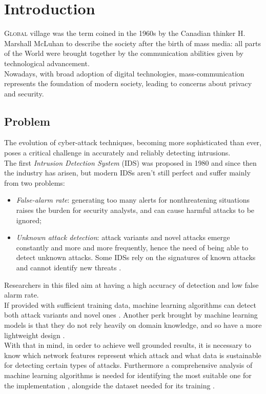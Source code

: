 \chapter{Introduction}
\label{chap:intro}

\lettrine[lines=3, findent=3pt, nindent=0pt]{G}{lobal} village was the term coined in the 1960s by the Canadian thinker H. Marshall McLuhan \cite{mcluhan1962} to describe the society after the birth of mass media: all parts of the World were brought together by the communication abilities given by technological advancement. \\
Nowadays, with broad adoption of digital technologies, mass-communication represents the foundation of modern society, leading to concerns about privacy and security.




\section{Problem}
\label{sec:problem}

The evolution of cyber-attack techniques, becoming more sophisticated than ever, poses a critical challenge in accurately and reliably detecting intrusions.\\ The first \textit{Intrusion Detection System} (IDS) was proposed in 1980 \cite{Andreson1980} and since then the industry has arisen, but modern IDSs aren't still perfect and suffer mainly from two problems:
\begin{itemize}
    \item[\faCaretRight] \textit{False-alarm rate}: generating too many alerts for nonthreatening situations raises the burden for security analysts, and can cause harmful attacks to be ignored;
    \item[\faCaretRight] \textit{Unknown attack detection}: attack variants and novel attacks emerge constantly and more and more frequently, hence the need of being able to detect unknown attacks. Some IDSs rely on the signatures of known attacks and cannot identify new threats \cite{Hodo2017}.
\end{itemize}
Researchers in this filed aim at having a high accuracy of detection and low false alarm rate. \\
If provided with sufficient training data, machine learning algorithms can detect both attack variants and novel ones \cite{Hodo2017}. Another perk brought by machine learning models is that they do not rely heavily on domain knowledge, and so have a more lightweight design \cite{Khraisat2019}. \\ With that in mind, in order to achieve well grounded results, it is necessary to know which network features represent which attack \cite{Iglesias2015} and what data is sustainable for detecting certain types of attacks. Furthermore a comprehensive analysis of machine learning algorithms is needed for identifying the most suitable one for the implementation \cite{Liu2019}, alongside the dataset needed for its training \cite{Sharafaldin2019}.


